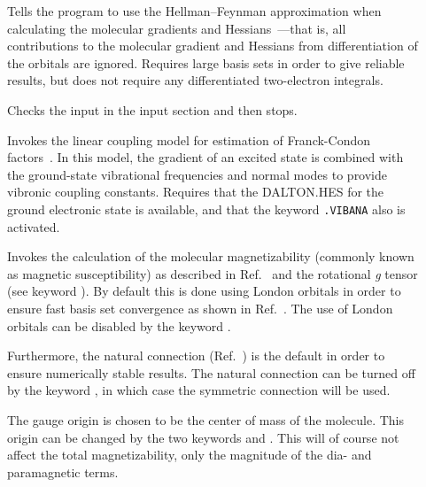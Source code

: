 \begin{description}
\item[]
Tells the program to use the Hellman--Feynman approximation when
calculating the molecular gradients and
Hessians~\cite{hhbook,rpfpr56,vbthwkkrmp96}---that is, all 
contributions to the molecular gradient and Hessians from
differentiation of the orbitals are ignored. Requires large basis sets
in order to give reliable results, but does not require any
differentiated two-electron integrals.

%

\item[] Checks the input in the  input
  section and then stops.


\item[] Invokes the linear coupling model for estimation
of Franck-Condon factors~\cite{optphavckrcp260}. In this model, the
gradient of an excited state is combined with the ground-state
vibrational frequencies and normal modes to provide vibronic coupling
constants. Requires that the DALTON.HES for the ground electronic
state is available, and that the keyword \verb|.VIBANA| also is
activated.

\item[] Invokes the calculation of the molecular
magnetizability (commonly known as magnetic
susceptibility) as 
described in Ref.~\cite{krthklbpjhjajjcp99} and the rotational {\em g}
tensor (see keyword ).  By
default this is done 
using London orbitals in order to 
ensure fast basis set convergence as shown in
Ref.~\cite{krthklbpjhjajjcp99}. The use of London
orbitals can be disabled by the keyword .

Furthermore, the natural connection
(Ref.~\cite{joklbkrthpjtca90,krthjopjklbcpl235}) is the default in order to ensure
numerically stable results. The natural
connection can be turned off by the keyword , in which case
the symmetric connection will be used.

The gauge origin is chosen to be the center of
mass of the molecule. 
This origin can be changed by the two keywords  and
. This will of course not affect the total magnetizability,
only the magnitude of the dia- and paramagnetic terms.


\end{description}
